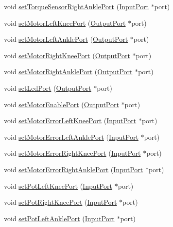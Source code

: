 \begin{DoxyCompactItemize}
\item 
void \hyperlink{classBoard_a269e4e67787dc9e27d472e5c88f0fe83}{set\+Torque\+Sensor\+Right\+Ankle\+Port} (\hyperlink{classInputPort}{Input\+Port} $\ast$port)
\item 
void \hyperlink{classBoard_a480facbc78ceaec928897e80be948977}{set\+Motor\+Left\+Knee\+Port} (\hyperlink{classOutputPort}{Output\+Port} $\ast$port)
\item 
void \hyperlink{classBoard_aebeebf46653c0d1009fd0129ba65c2a0}{set\+Motor\+Left\+Ankle\+Port} (\hyperlink{classOutputPort}{Output\+Port} $\ast$port)
\item 
void \hyperlink{classBoard_acdb5c2acbf9de0d43b06558d0b4cd5f1}{set\+Motor\+Right\+Knee\+Port} (\hyperlink{classOutputPort}{Output\+Port} $\ast$port)
\item 
void \hyperlink{classBoard_a0f1b706acf8d29f207773f1d922946b8}{set\+Motor\+Right\+Ankle\+Port} (\hyperlink{classOutputPort}{Output\+Port} $\ast$port)
\item 
void \hyperlink{classBoard_aeb8a60226ae21067632c011dd339b76c}{set\+Led\+Port} (\hyperlink{classOutputPort}{Output\+Port} $\ast$port)
\item 
void \hyperlink{classBoard_ac3bb78d67ffca86fd4c780308d327e45}{set\+Motor\+Enable\+Port} (\hyperlink{classOutputPort}{Output\+Port} $\ast$port)
\item 
void \hyperlink{classBoard_ab36460d8e4b01128ff0060261b086577}{set\+Motor\+Error\+Left\+Knee\+Port} (\hyperlink{classInputPort}{Input\+Port} $\ast$port)
\item 
void \hyperlink{classBoard_acdec893b7034bd0175980a6b31c7c611}{set\+Motor\+Error\+Left\+Ankle\+Port} (\hyperlink{classInputPort}{Input\+Port} $\ast$port)
\item 
void \hyperlink{classBoard_a944f77aeca71cc0c6afb06355222f01c}{set\+Motor\+Error\+Right\+Knee\+Port} (\hyperlink{classInputPort}{Input\+Port} $\ast$port)
\item 
void \hyperlink{classBoard_a703739a87f21444992922b328710f04c}{set\+Motor\+Error\+Right\+Ankle\+Port} (\hyperlink{classInputPort}{Input\+Port} $\ast$port)
\item 
void \hyperlink{classBoard_a7016b22924417ccfb6a1932bdd8fc78f}{set\+Pot\+Left\+Knee\+Port} (\hyperlink{classInputPort}{Input\+Port} $\ast$port)
\item 
void \hyperlink{classBoard_ad5ad3dc269c1c2f22e1d22e2f69daefc}{set\+Pot\+Right\+Knee\+Port} (\hyperlink{classInputPort}{Input\+Port} $\ast$port)
\item 
void \hyperlink{classBoard_ad79af5f3ce4dd29f53127e5b27aa11be}{set\+Pot\+Left\+Ankle\+Port} (\hyperlink{classInputPort}{Input\+Port} $\ast$port)

\end{DoxyCompactItemize}
